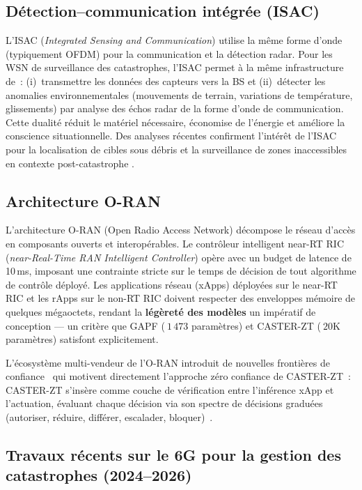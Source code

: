 \subsection{Détection--communication intégrée (ISAC)}

L'ISAC (\emph{Integrated Sensing and Communication}) utilise la même forme d'onde (typiquement OFDM) pour la communication et la détection radar. Pour les WSN de surveillance des catastrophes, l'ISAC permet à la même infrastructure de~: (i)~transmettre les données des capteurs vers la BS et (ii)~détecter les anomalies environnementales (mouvements de terrain, variations de température, glissements) par analyse des échos radar de la forme d'onde de communication. Cette dualité réduit le matériel nécessaire, économise de l'énergie et améliore la conscience situationnelle. Des analyses récentes confirment l'intérêt de l'ISAC pour la localisation de cibles sous débris et la surveillance de zones inaccessibles en contexte post-catastrophe \cite{isac_disaster_lwc2025}.

\subsection{Architecture O-RAN}

L'architecture O-RAN (Open Radio Access Network) décompose le réseau d'accès en composants ouverts et interopérables. Le contrôleur intelligent near-RT RIC (\emph{near-Real-Time RAN Intelligent Controller}) opère avec un budget de latence de 10\,ms, imposant une contrainte stricte sur le temps de décision de tout algorithme de contrôle déployé. Les applications réseau (xApps) déployées sur le near-RT RIC et les rApps sur le non-RT RIC doivent respecter des enveloppes mémoire de quelques mégaoctets, rendant la \textbf{légèreté des modèles} un impératif de conception --- un critère que GAPF (${~}1\,473$ paramètres) et CASTER-ZT (${~}20$K paramètres) satisfont explicitement.

L'écosystème multi-vendeur de l'O-RAN introduit de nouvelles frontières de confiance~\cite{rose2020nist,oran_survey_acm2024} qui motivent directement l'approche zéro confiance de CASTER-ZT~: CASTER-ZT s'insère comme couche de vérification entre l'inférence xApp et l'actuation, évaluant chaque décision via son spectre de décisions graduées (autoriser, réduire, différer, escalader, bloquer)~\cite{alshiekh2018shielding}.

\subsection{Travaux récents sur le 6G pour la gestion des catastrophes (2024--2026)}

